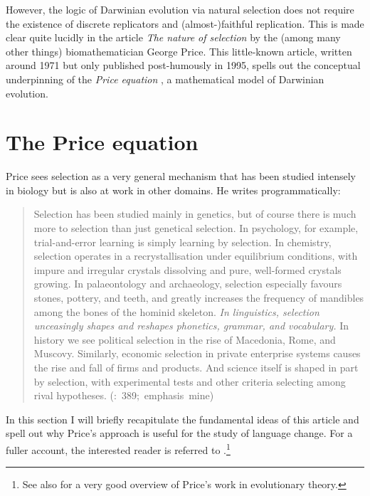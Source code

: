 \documentclass[output=paper,hidelinks]{langscibook}
\begin{document}
However, the logic of Darwinian evolution via natural selection does not require the
existence of discrete replicators and (almost-)faithful replication. This is made clear
quite lucidly in the article \emph{The nature of selection} \citep{price95} by the (among
many other things) biomathematician George Price. This little-known article, written
around 1971 but only published post-humously in 1995, spells out the conceptual
underpinning of the \emph{Price equation} \citep{price70}, a mathematical model of
Darwinian evolution.

\section{The Price equation}

Price sees selection as a very general mechanism that has been studied intensely in
biology but is also at work in other domains. He writes programmatically:

\begin{quotation}
  Selection has been studied mainly in genetics, but of course there is much more to
  selection than just genetical selection.  In psychology, for example, trial-and-error
  learning is simply learning by selection.  In chemistry, selection operates in a
  recrystallisation under equilibrium conditions, with impure and irregular crystals
  dissolving and pure, well-formed crystals growing. In palaeontology and archaeology,
  selection especially favours stones, pottery, and teeth, and greatly increases the
  frequency of mandibles among the bones of the hominid skeleton.  \emph{In linguistics,
    selection unceasingly shapes and reshapes phonetics, grammar, and vocabulary.} In
  history we see political selection in the rise of Macedonia, Rome, and Muscovy.
  Similarly, economic selection in private enterprise systems causes the rise and fall of
  firms and products. And science itself is shaped in part by selection, with experimental
  tests and other criteria selecting among rival hypotheses. \hfill\hbox{(\citealt{price95}: 389;
  emphasis mine)}
\end{quotation}

In this section I will briefly recapitulate the fundamental ideas of this article and
spell out why Price's approach is useful for the study of language change. For a fuller
account, the interested reader is referred to \citet{jaeger08Price}.\footnote{See also
  \citet{frank95} for a very good overview of Price's work in evolutionary theory.}
\end{document}
